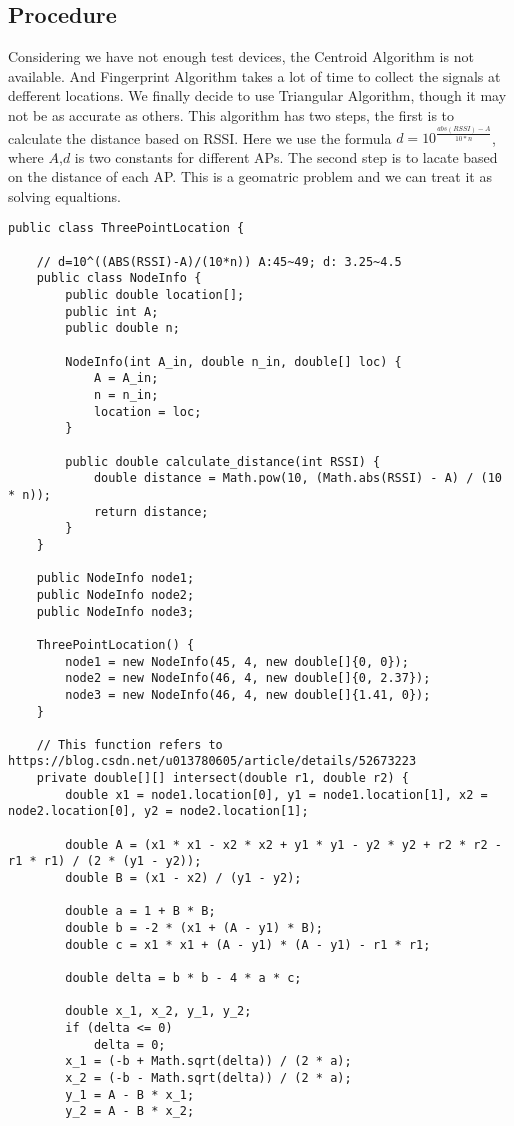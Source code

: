 \documentclass[12pt]{report}
\begin{document}
\subsection{Procedure}
Considering we have not enough test devices, the Centroid Algorithm is not available. And Fingerprint Algorithm takes a lot of time to collect the signals at defferent locations. We finally decide to use Triangular Algorithm, though it may not be as accurate as others. This algorithm has two steps, the first is to calculate the distance based on RSSI. Here we use the formula $d=10^{\frac{abs(RSSI)-A}{10*n}}$, where $A$,$d$ is two constants for different APs. The second step is to lacate based on the distance of each AP. This is a geomatric problem and we can treat it as solving equaltions.
\begin{lstlisting}
public class ThreePointLocation {

	// d=10^((ABS(RSSI)-A)/(10*n)) A:45~49; d: 3.25~4.5
	public class NodeInfo {
		public double location[];
		public int A;
		public double n;
		
		NodeInfo(int A_in, double n_in, double[] loc) {
			A = A_in;
			n = n_in;
			location = loc;
		}
		
		public double calculate_distance(int RSSI) {
			double distance = Math.pow(10, (Math.abs(RSSI) - A) / (10 * n));
			return distance;
		}
	}
	
	public NodeInfo node1;
	public NodeInfo node2;
	public NodeInfo node3;
	
	ThreePointLocation() {
		node1 = new NodeInfo(45, 4, new double[]{0, 0});
		node2 = new NodeInfo(46, 4, new double[]{0, 2.37});
		node3 = new NodeInfo(46, 4, new double[]{1.41, 0});
	}
	
	// This function refers to https://blog.csdn.net/u013780605/article/details/52673223
	private double[][] intersect(double r1, double r2) {
		double x1 = node1.location[0], y1 = node1.location[1], x2 = node2.location[0], y2 = node2.location[1];
		
		double A = (x1 * x1 - x2 * x2 + y1 * y1 - y2 * y2 + r2 * r2 - r1 * r1) / (2 * (y1 - y2));
		double B = (x1 - x2) / (y1 - y2);
		
		double a = 1 + B * B;
		double b = -2 * (x1 + (A - y1) * B);
		double c = x1 * x1 + (A - y1) * (A - y1) - r1 * r1;
		
		double delta = b * b - 4 * a * c;
		
		double x_1, x_2, y_1, y_2;
		if (delta <= 0)
			delta = 0;
		x_1 = (-b + Math.sqrt(delta)) / (2 * a);
		x_2 = (-b - Math.sqrt(delta)) / (2 * a);
		y_1 = A - B * x_1;
		y_2 = A - B * x_2;
		

\end{lstlisting}
\end{document}
